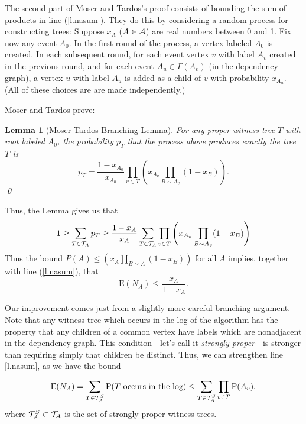 \documentclass[letterpaper]{article}
\newcommand{\p}{\textrm{P}}
\newcommand{\e}{\textrm{E}}
\newcommand{\aaa}{{\cal A}}
\newcommand{\ttt}{{\cal T}}
\newcommand{\sbs}{\subset}
\newtheorem{lemma}[theorem]{Lemma}
\theoremstyle{definition}
\theoremstyle{remark}
\begin{document}
The second part of Moser and Tardos's proof consists of bounding the sum of products in line (\ref{l.nasum}).  They do this by considering a random process for constructing trees:  Suppose $x_A$ ($A\in \aaa$) are real numbers between 0 and 1.  Fix now any event $A_0$.  In the first round of the process, a vertex labeled $A_0$ is created.  In each subsequent round, for each event vertex $v$ with label $A_v$ created in the previous round, and for each event $A_u\in \bar\Gamma(A_v)$ (in the dependency graph), a vertex $u$ with label $A_u$ is added as a child of $v$ with probability $x_{A_u}$.  (All of these choices are are made independently.)

Moser and Tardos prove:
\begin{lemma}[Moser Tardos Branching Lemma]
  For any proper witness tree $T$ with root labeled $A_0$, the probability $p_T$ that the process above produces exactly the tree $T$ is
\begin{equation}
  p_T=\frac{1-x_{A_0}}{x_{A_0}}\prod_{v\in T}\left(x_{A_v}\prod_{B\sim A_v}(1-x_B)\right).
\end{equation}
\qed
\end{lemma}

Thus, the Lemma gives us that 
\begin{equation}
1\geq \sum_{T\in \ttt_A} p_T\geq
\frac{1-x_{A}}{x_{A}}\sum_{T\in \ttt_A}\prod_{v\in T}\left(x_{A_v}\prod_{B\sim A_v}(1-x_B)\right)
\end{equation}
Thus the bound $P(A)\leq \left(x_{A}\prod_{B\sim A}(1-x_B)\right)$ for all $A$ implies, together with line (\ref{l.nasum}), that 
\begin{equation}
  \e(N_A)\leq \frac{x_A}{1-x_A}.
\end{equation}

Our improvement comes just from a slightly more careful branching argument.  Note that any witness tree which occurs in the log of the algorithm has the property that any children of a common vertex have labels which are nonadjacent in the dependency graph.  This condition---let's call it \emph{strongly proper}---is stronger than requiring simply that children be distinct.  Thus, we can strengthen line \ref{l.nasum}, as we have the bound

\begin{equation}
\e(N_A)=\sum_{T\in \ttt^S_A} \p(T \textrm{ occurs in the log})\leq \sum_{T\in \ttt^S_A}\prod_{v\in T} \p(A_v).
\label{l.rnasum}
\end{equation}
where $\ttt_A^S\sbs \ttt_A$ is the set of strongly proper witness trees.  
\end{document}
